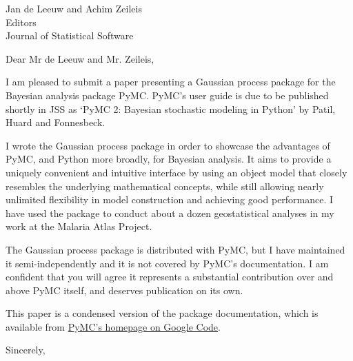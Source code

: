 \documentclass{letter}
\begin{document}

\begin{letter}{Jan de Leeuw and Achim Zeileis \\ Editors \\ Journal of Statistical Software}
\opening{Dear Mr de Leeuw and Mr. Zeileis,}

I am pleased to submit a paper presenting a Gaussian process package for the Bayesian analysis package PyMC. PyMC's user guide is due to be published shortly in JSS as `PyMC 2: Bayesian stochastic modeling in Python' by Patil, Huard and Fonnesbeck.

I wrote the Gaussian process package in order to showcase the advantages of PyMC, and Python more broadly, for Bayesian analysis. It aims to provide a uniquely convenient and intuitive interface by using an object model that closely resembles the underlying mathematical concepts, while still allowing nearly unlimited flexibility in model construction and achieving good performance. I have used the package to conduct about a dozen geostatistical analyses in my work at the Malaria Atlas Project.

The Gaussian process package is distributed with PyMC, but I have maintained it semi-independently and it is not covered by PyMC's documentation. I am confident that you will agree it represents a substantial contribution over and above PyMC itself, and deserves publication on its own.

This paper is a condensed version of the package documentation, which is available from \href{http://pymc.googlecode.com/files/GPUserGuide.pdf}{PyMC's homepage on Google Code}.

\closing{Sincerely,}

\end{letter}
\end{document}
